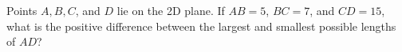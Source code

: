 Points $A, B, C$, and $D$ lie on the 2D plane. If $AB = 5$, $BC = 7$, and $CD = 15$, what is the positive difference between the largest and smallest possible lengths of $AD$?
